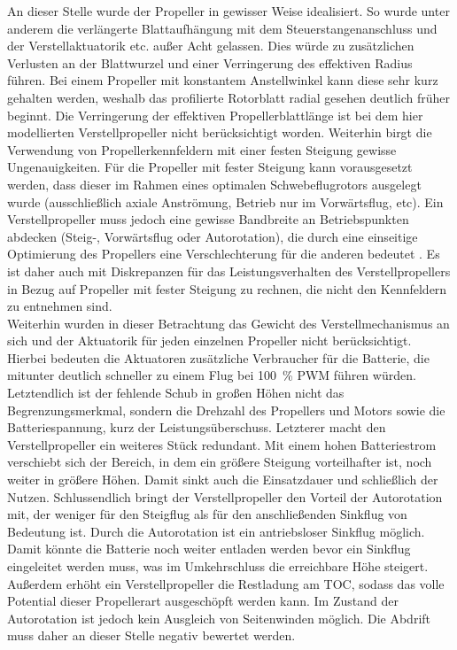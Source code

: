 An dieser Stelle wurde der Propeller in gewisser Weise idealisiert. So wurde unter anderem die verlängerte Blattaufhängung mit dem Steuerstangenanschluss und der Verstellaktuatorik etc. außer Acht gelassen. Dies würde zu zusätzlichen Verlusten an der Blattwurzel und einer Verringerung des effektiven Radius führen. Bei einem Propeller mit konstantem Anstellwinkel kann diese sehr kurz gehalten werden, weshalb das profilierte Rotorblatt radial gesehen deutlich früher beginnt. Die Verringerung der effektiven Propellerblattlänge ist bei dem hier modellierten Verstellpropeller nicht berücksichtigt worden. Weiterhin birgt die Verwendung von Propellerkennfeldern mit einer festen Steigung gewisse Ungenauigkeiten. Für die Propeller mit fester Steigung kann vorausgesetzt werden, dass dieser im Rahmen eines optimalen Schwebeflugrotors \cite[S.197-S.205]{Wall.2015} ausgelegt wurde (ausschließlich axiale Anströmung, Betrieb nur im Vorwärtsflug, etc). Ein Verstellpropeller muss jedoch eine gewisse Bandbreite an Betriebspunkten abdecken (Steig-, Vorwärtsflug oder Autorotation), die durch eine einseitige Optimierung des Propellers eine Verschlechterung für die anderen bedeutet \cite[S.203]{Wall.2015}. Es ist daher auch mit Diskrepanzen für das Leistungsverhalten des Verstellpropellers in Bezug auf Propeller mit fester Steigung zu rechnen, die nicht den Kennfeldern zu entnehmen sind. \\
Weiterhin wurden in dieser Betrachtung das Gewicht des Verstellmechanismus an sich und der Aktuatorik für jeden einzelnen Propeller nicht berücksichtigt. Hierbei bedeuten die Aktuatoren zusätzliche Verbraucher für die Batterie, die mitunter deutlich schneller zu einem Flug bei \SI{100}{\%} PWM führen würden. Letztendlich ist der fehlende Schub in großen Höhen nicht das Begrenzungsmerkmal, sondern die Drehzahl des Propellers und Motors sowie die Batteriespannung, kurz der Leistungsüberschuss. Letzterer macht den Verstellpropeller ein weiteres Stück redundant. %
Mit einem hohen Batteriestrom verschiebt sich der Bereich, in dem ein größere Steigung vorteilhafter ist, noch weiter in größere Höhen. Damit sinkt auch die Einsatzdauer und schließlich der Nutzen. 
Schlussendlich bringt der Verstellpropeller den Vorteil der Autorotation mit, der weniger für den Steigflug als für den anschließenden Sinkflug von Bedeutung ist. Durch die Autorotation ist ein antriebsloser Sinkflug möglich. Damit könnte die Batterie noch weiter entladen werden bevor ein Sinkflug eingeleitet werden muss, was im Umkehrschluss die erreichbare Höhe steigert. Außerdem erhöht ein Verstellpropeller die Restladung am TOC, sodass das volle Potential dieser Propellerart ausgeschöpft werden kann. Im Zustand der Autorotation ist jedoch kein Ausgleich von Seitenwinden möglich. Die Abdrift muss daher an dieser Stelle negativ bewertet werden. \\
